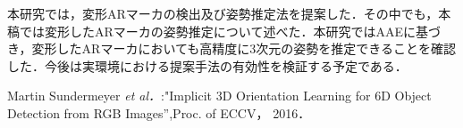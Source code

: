 \documentclass{jsarticle}
\begin{document}
本研究では，変形ARマーカの検出及び姿勢推定法を提案した．その中でも，本稿では変形したARマーカの姿勢推定について述べた．本研究ではAAEに基づき，変形したARマーカにおいても高精度に3次元の姿勢を推定できることを確認した．今後は実環境における提案手法の有効性を検証する予定である．

%
%
%

\begin{thebibliography}{1}

{\scriptsize 
{}
Martin Sundermeyer {\em et al．}:"Implicit 3D Orientation Learning for 6D Object Detection from RGB Images'',Proc. of ECCV， 2016．}

\end{thebibliography}
\end{document}
